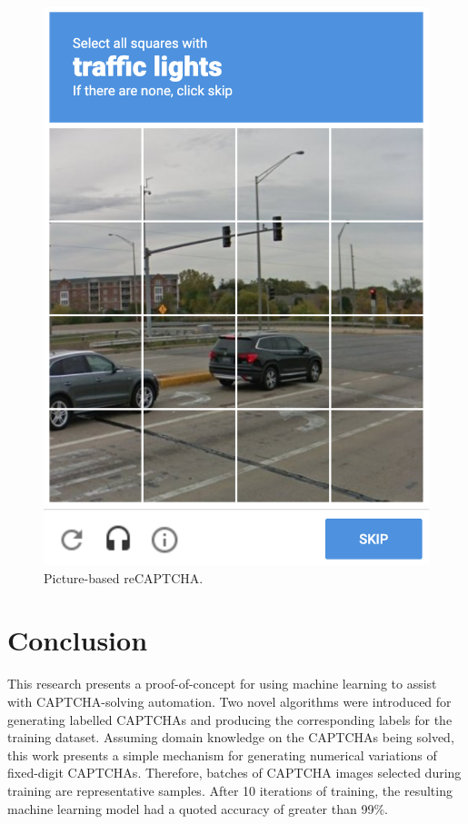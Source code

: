 \documentclass[11pt,conference]{IEEEtran}
\begin{document}
\begin{figure}[htbp]
	\centerline{\includegraphics[scale=0.35]{images/picture-recaptcha.png}}
	\caption{Picture-based reCAPTCHA.}
	\label{figure}
\end{figure}

\section{Conclusion}
This research presents a proof-of-concept for using machine learning to assist
with CAPTCHA-solving automation. Two novel algorithms were
introduced for generating labelled CAPTCHAs and producing the corresponding
labels for the training dataset. Assuming domain knowledge on the CAPTCHAs
being solved, this work presents a simple mechanism for generating numerical variations of fixed-digit CAPTCHAs. Therefore, batches of
CAPTCHA images selected during training are representative samples. After 10
iterations of training, the resulting machine learning model had a quoted
accuracy of greater than 99\%. 
\end{document}
